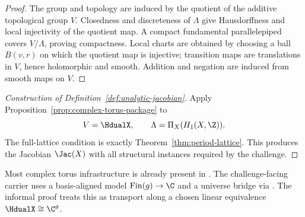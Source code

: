 \begin{proof}
\leanok
The group and topology are induced by the quotient of the additive topological
group \(V\). Closedness and discreteness of \(\Lambda\) give Hausdorffness and
local injectivity of the quotient map. A compact fundamental parallelepiped
covers \(V/\Lambda\), proving compactness. Local charts are obtained by
choosing a ball \(B(v,r)\) on which the quotient map is injective; transition
maps are translations in \(V\), hence holomorphic and smooth. Addition and
negation are induced from smooth maps on \(V\).
\end{proof}

\begin{proof}[Construction of Definition~\ref{def:analytic-jacobian}]
Apply Proposition~\ref{prop:complex-torus-package} to
\[
  V=\HdualX,\qquad \Lambda=\Pi_X(H_1(X,\Z)).
\]
The full-lattice condition is exactly Theorem~\ref{thm:period-lattice}. This
produces the Jacobian \(\Jac(X)\) with all structural instances required by
the challenge.
\end{proof}

\begin{formalizationnote}
Most complex torus infrastructure is already present in
. The challenge-facing carrier uses a
basis-aligned model \(\operatorname{Fin}(g)\to\C\) and a universe bridge via
. The informal proof treats this as transport along a chosen
linear equivalence \(\HdualX\cong\C^g\).
\end{formalizationnote}
